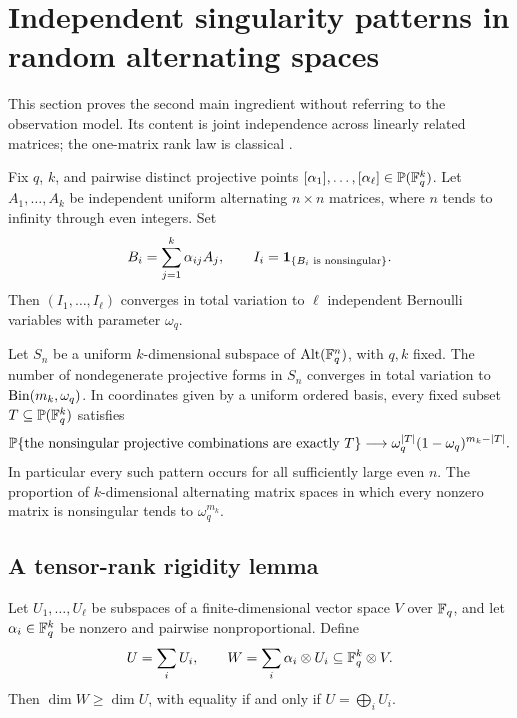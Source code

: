 \section{Independent singularity patterns in random alternating spaces}
\label{sec:alternating}

This section proves the second main ingredient without referring to the
observation model. Its content is joint independence across linearly related
matrices; the one-matrix rank law is classical \cite{fulman,pott}.

\begin{theorem}
\label{thm:pencil}
Fix $q$, $k$, and pairwise distinct projective points
$[\alpha_1],\ldots,[\alpha_\ell]\in\mathbb P(\mathbb F_q^k)$. Let
$A_1,\ldots,A_k$ be independent uniform alternating $n\times n$ matrices,
where $n$ tends to infinity through even integers. Set
\[
 B_i=\sum_{j=1}^k\alpha_{ij}A_j,\qquad
 I_i=\mathbf 1_{\{B_i\text{ is nonsingular}\}}.
\]
Then $(I_1,\ldots,I_\ell)$ converges in total variation to $\ell$ independent
Bernoulli variables with parameter $\omega_q$.
\end{theorem}

\begin{corollary}
\label{cor:random-space}
Let $S_n$ be a uniform $k$-dimensional subspace of $\operatorname{Alt}(\mathbb F_q^n)$, with
$q,k$ fixed. The number of nondegenerate projective forms in $S_n$ converges
in total variation to $\operatorname{Bin}(m_k,\omega_q)$. In coordinates given by a uniform
ordered basis, every fixed subset $T\subseteq\mathbb P(\mathbb F_q^k)$ satisfies
\begin{equation}
 \mathbb P\{\text{the nonsingular projective combinations are exactly }T\}
 \longrightarrow \omega_q^{|T|}(1-\omega_q)^{m_k-|T|}.
 \label{eq:pattern}
\end{equation}
In particular every such pattern occurs for all sufficiently large even
$n$. The proportion of $k$-dimensional alternating matrix spaces in which
every nonzero matrix is nonsingular tends to $\omega_q^{m_k}$.
\end{corollary}

\subsection{A tensor-rank rigidity lemma}

\begin{lemma}
\label{lem:tensor}
Let $U_1,\ldots,U_\ell$ be subspaces of a finite-dimensional vector space
$V$ over $\mathbb F_q$, and let $\alpha_i\in\mathbb F_q^k$ be nonzero and pairwise
nonproportional. Define
\[
 U=\sum_iU_i,\qquad W=\sum_i\alpha_i\otimes U_i\subseteq\mathbb F_q^k\otimes V.
\]
Then $\dim W\ge\dim U$, with equality if and only if
$U=\bigoplus_iU_i$.
\end{lemma}

